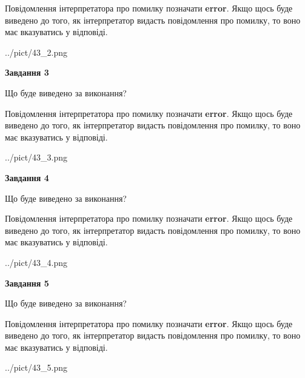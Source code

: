 \documentclass[12pt, ukrainian]{article}
\begin{document}
{\begin {large}
Повідомлення інтерпретатора про помилку позначати \textbf{error}.
Якщо щось буде виведено до того, як інтерпретатор видасть повідомлення про помилку, 
то воно має вказуватись у відповіді. \par


\begin{center}
	{../pict/43_2.png}
\end{center}
\newpage

{\begin {center}\textbf{Завдання 3}\end {center}}\par
Що буде виведено за виконання?

Повідомлення інтерпретатора про помилку позначати \textbf{error}.
Якщо щось буде виведено до того, як інтерпретатор видасть повідомлення про помилку, 
то воно має вказуватись у відповіді. \par


\begin{center}
	{../pict/43_3.png}
\end{center}
\newpage

{\begin {center}\textbf{Завдання 4}\end {center}}\par
Що буде виведено за виконання?

Повідомлення інтерпретатора про помилку позначати \textbf{error}.
Якщо щось буде виведено до того, як інтерпретатор видасть повідомлення про помилку, 
то воно має вказуватись у відповіді. \par


\begin{center}
	{../pict/43_4.png}
\end{center}
\newpage

{\begin {center}\textbf{Завдання 5}\end {center}}\par
Що буде виведено за виконання?

Повідомлення інтерпретатора про помилку позначати \textbf{error}.
Якщо щось буде виведено до того, як інтерпретатор видасть повідомлення про помилку, 
то воно має вказуватись у відповіді. \par


\begin{center}
	{../pict/43_5.png}
\end{center}
\newpage


\end{large}}
\end{document}
